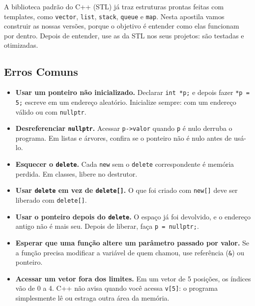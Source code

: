 A biblioteca padrão do C++ (STL) já traz estruturas prontas feitas com templates, como \texttt{vector}, \texttt{list}, \texttt{stack}, \texttt{queue} e \texttt{map}. Nesta apostila vamos construir as nossas versões, porque o objetivo é entender como elas funcionam por dentro. Depois de entender, use as da STL nos seus projetos: são testadas e otimizadas.

\subsection{Erros Comuns}

\begin{itemize}
  \item \textbf{Usar um ponteiro não inicializado.} Declarar \texttt{int *p;} e depois fazer \texttt{*p = 5;} escreve em um endereço aleatório. Inicialize sempre: com um endereço válido ou com \texttt{nullptr}.
  \item \textbf{Desreferenciar \texttt{nullptr}.} Acessar \texttt{p->valor} quando \texttt{p} é nulo derruba o programa. Em listas e árvores, confira se o ponteiro não é nulo antes de usá-lo.
  \item \textbf{Esquecer o \texttt{delete}.} Cada \texttt{new} sem o \texttt{delete} correspondente é memória perdida. Em classes, libere no destrutor.
  \item \textbf{Usar \texttt{delete} em vez de \texttt{delete[]}.} O que foi criado com \texttt{new[]} deve ser liberado com \texttt{delete[]}.
  \item \textbf{Usar o ponteiro depois do \texttt{delete}.} O espaço já foi devolvido, e o endereço antigo não é mais seu. Depois de liberar, faça \texttt{p = nullptr;}.
  \item \textbf{Esperar que uma função altere um parâmetro passado por valor.} Se a função precisa modificar a variável de quem chamou, use referência (\texttt{\&}) ou ponteiro.
  \item \textbf{Acessar um vetor fora dos limites.} Em um vetor de 5 posições, os índices vão de 0 a 4. C++ não avisa quando você acessa \texttt{v[5]}: o programa simplesmente lê ou estraga outra área da memória.
\end{itemize}
